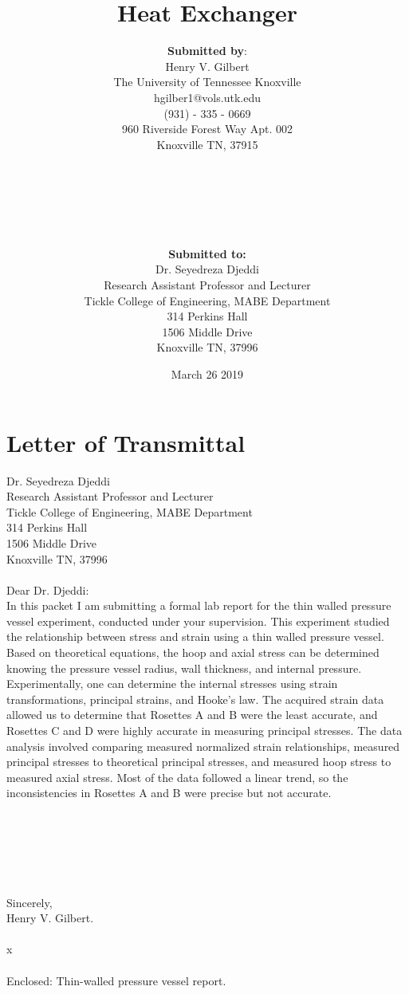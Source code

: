 \documentclass[12pt]{article}
\title{Heat Exchanger}
\author{
	\textbf{Submitted by}: \\
	Henry V. Gilbert \\
	The University of Tennessee Knoxville \\
	hgilber1@vols.utk.edu \\
	(931) - 335 - 0669 \\
	960 Riverside Forest Way
	Apt. 002 \\
	Knoxville TN, 37915\\ \\ \\ \\ \\ \\ \\ 
	\textbf{Submitted to: }\\ 
	Dr. Seyedreza Djeddi \\
	Research Assistant Professor and Lecturer \\
	Tickle College of Engineering, MABE Department \\
	314 Perkins Hall \\
	1506 Middle Drive \\
	Knoxville TN, 37996 \\
	}
\date {March 26 2019}
\begin{document}
\maketitle

\newpage
\section*{Letter of Transmittal}
Dr. Seyedreza Djeddi \\
Research Assistant Professor and Lecturer \\
Tickle College of Engineering, MABE Department \\
314 Perkins Hall \\
1506 Middle Drive \\
Knoxville TN, 37996 \\ \\
Dear Dr. Djeddi: \\ 

In this packet I am submitting a formal lab report for the thin walled pressure vessel experiment, 
conducted under your supervision. This experiment studied the relationship between stress and
strain using a thin walled pressure vessel. Based on theoretical equations, the hoop and 
axial stress can be determined knowing the pressure vessel radius, wall thickness, and internal
pressure. Experimentally, one can determine the internal stresses using strain transformations,
principal strains, and Hooke's law. The acquired strain data allowed us to determine that Rosettes A 
and B were the least accurate, and Rosettes C and D were highly accurate in measuring 
principal stresses. The data analysis involved comparing measured normalized strain relationships,
measured principal stresses to theoretical principal stresses, and measured hoop stress to 
measured axial stress. Most of the data followed a linear trend, so the inconsistencies in Rosettes A 
and B were precise but not accurate. \\  \\ \\ \\  \\ \\
\\ 
Sincerely, \\
Henry V. Gilbert. \\ \\ 
x \\ \\ 
Enclosed: Thin-walled pressure vessel report. 
\end{document}
